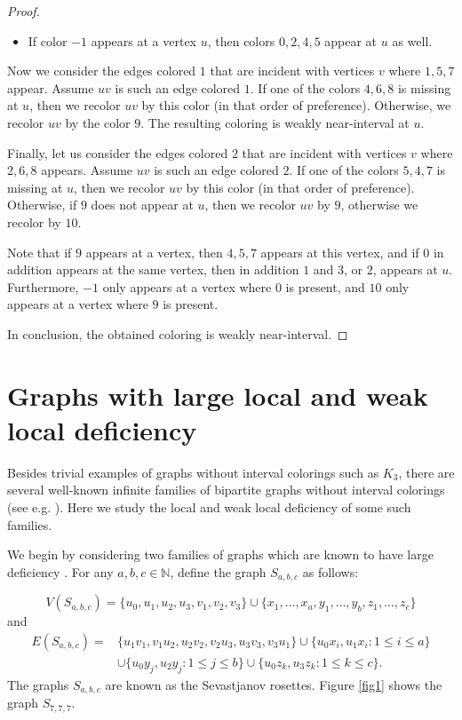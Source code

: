 \documentclass[12pt]{article}
\theoremstyle{plain}
\theoremstyle{definition}
\numberwithin{equation}{section}
\begin{document}
\begin{proof}
\begin{itemize}
	\item[(b)]	If color $-1$ appears at a vertex $u$, then colors $0,2,4,5$ appear at $u$ as well.
\end{itemize}

	Now we consider the edges colored $1$ that are incident with vertices $v$ where $1,5,7$ appear.
	Assume $uv$ is such an edge colored $1$. If one of the colors $4,6,8$ is missing at $u$,
	then we recolor $uv$ by this color (in that order of preference). Otherwise,	
	we recolor $uv$ by the color $9$. The resulting coloring is weakly near-interval at $u$.

	Finally, let us consider the edges colored $2$ that are incident with vertices $v$ where $2,6,8$ appears.
	Assume $uv$ is such an edge colored $2$. If one of the colors $5,4,7$ is missing at $u$,
	then we recolor $uv$ by this color (in that order of preference).
	Otherwise, if $9$ does not appear at $u$, then we recolor $uv$ by $9$, otherwise
	we recolor by $10$.

	Note that if $9$ appears at a vertex, then $4,5,7$ appears at this vertex, and if $0$ in addition
	appears at the same vertex, then in addition $1$ and $3$, or $2$, appears at $u$.
	Furthermore, $-1$ only appears at a vertex where $0$ is present, and $10$ only appears at a vertex
	where $9$ is present.

	In conclusion, the obtained coloring is weakly near-interval.
\end{proof}




\section{Graphs with large local and weak local deficiency}

Besides trivial examples of graphs without interval colorings such as $K_3$, there are several well-known infinite families of bipartite graphs without interval colorings
(see e.g. \cite{GiaroKubaleMalaf1, PetrosHrant}). Here we study the local and weak local deficiency
of some such families.
	
	We begin by considering two families of graphs which are known to have
	large deficiency \cite{GiaroKubaleMalaf1}.
For any $a,b,c\in \mathbb{N}$, define the graph $S_{a,b,c}$ as follows:

$$V(S_{a,b,c})=\{u_{0},u_{1},u_{2},u_{3},v_{1},v_{2},v_{3}\}\cup \{x_{1},\ldots, x_{a},y_{1},\ldots, y_{b},z_{1},\ldots,z_{c}\}
$$
and
\begin{align*}
E(S_{a,b,c}) = & \{u_{1}v_{1},v_{1}u_{2},u_{2}v_{2},v_{2}u_{3},u_{3}v_{3},v_{3}u_{1}\}
\cup \{u_{0}x_{i},u_{1}x_{i}:1\leq i\leq a\}
\\
& \cup\{u_{0}y_{j},u_{2}y_{j}:1\leq j\leq b\}\cup\{u_{0}z_{k},u_{3}z_{k}:1\leq k\leq c\}.
\end{align*}
%
%
The graphs $S_{a,b,c}$ are known as the Sevastjanov rosettes. Figure \ref{fig1} shows the graph $S_{7,7,7}$.
\end{document}
